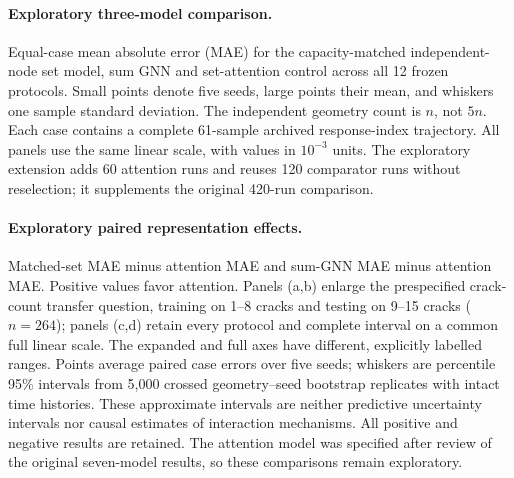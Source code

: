 \paragraph{Exploratory three-model comparison.}
Equal-case mean absolute error (MAE) for the capacity-matched independent-node set model, sum GNN and set-attention control across all 12 frozen protocols. Small points denote five seeds, large points their mean, and whiskers one sample standard deviation. The independent geometry count is $n$, not $5n$. Each case contains a complete 61-sample archived response-index trajectory. All panels use the same linear scale, with values in $10^{-3}$ units. The exploratory extension adds 60 attention runs and reuses 120 comparator runs without reselection; it supplements the original 420-run comparison.

\paragraph{Exploratory paired representation effects.}
Matched-set MAE minus attention MAE and sum-GNN MAE minus attention MAE. Positive values favor attention. Panels (a,b) enlarge the prespecified crack-count transfer question, training on 1--8 cracks and testing on 9--15 cracks ($n=264$); panels (c,d) retain every protocol and complete interval on a common full linear scale. The expanded and full axes have different, explicitly labelled ranges. Points average paired case errors over five seeds; whiskers are percentile 95\% intervals from 5,000 crossed geometry--seed bootstrap replicates with intact time histories. These approximate intervals are neither predictive uncertainty intervals nor causal estimates of interaction mechanisms. All positive and negative results are retained. The attention model was specified after review of the original seven-model results, so these comparisons remain exploratory.
